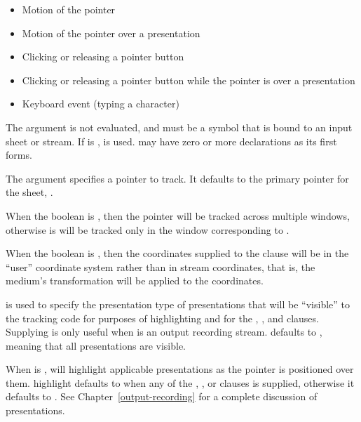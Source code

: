 \begin{itemize}
\item Motion of the pointer

\item Motion of the pointer over a presentation

\item Clicking or releasing a pointer button

\item Clicking or releasing a pointer button while the pointer is over a presentation

\item Keyboard event (typing a character)
\end{itemize}

The  argument is not evaluated, and must be a symbol that is bound to
an input sheet or stream.  If  is ,  is
used.   may have zero or more declarations as its first forms.

The  argument specifies a pointer to track.  It defaults to
the primary pointer for the sheet, .

When the boolean  is , then the pointer will be
tracked across multiple windows, otherwise is will be tracked only in the window
corresponding to .

When the boolean  is , then the coordinates supplied
to the  clause will be in the ``user'' coordinate system
rather than in stream coordinates, that is, the medium's transformation will be
applied to the coordinates.

 is used to specify the presentation type of presentations
that will be ``visible'' to the tracking code for purposes of highlighting and
for the , , and
 clauses.  Supplying  is only
useful when  is an output recording stream.  
defaults to , meaning that all presentations are visible.

When  is ,  will highlight
applicable presentations as the pointer is positioned over them.  {highlight}
defaults to  when any of the ,
, or  clauses is
supplied, otherwise it defaults to .  See
Chapter~\ref{output-recording} for a complete discussion of presentations.

